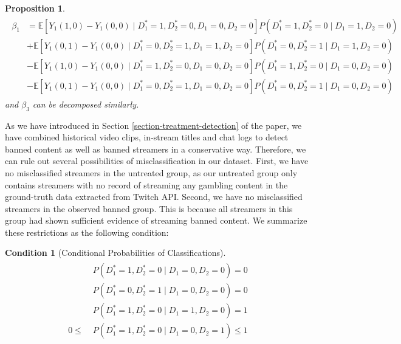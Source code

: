 \documentclass[a4paper,12pt]{article}
\newtheorem{condition}{Condition}
\newtheorem{proposition}{Proposition}
\begin{document}
\begin{proposition}\label{prop-1}
    \begin{align*}
        \begin{split}
            \beta_{1} &= \mathbb{E}[Y_1(1,0)-Y_1(0,0) \mid D_1^\ast=1, D_2^\ast=0,D_1=0,D_2=0]P(D_1^\ast=1,D_2^\ast=0 \mid D_1=1, D_2=0)\\
            &+ \mathbb{E}[Y_1(0,1)-Y_1(0,0) \mid D_1^\ast=0, D_2^\ast=1,D_1=1,D_2=0]P(D_1^\ast=0,D_2^\ast=1 \mid D_1=1, D_2=0)\\
            &-\mathbb{E}[Y_1(1,0)-Y_1(0,0) \mid D_1^\ast=1, D_2^\ast=0,D_1=0,D_2=0]P(D_1^\ast=1,D_2^\ast=0 \mid D_1=0, D_2=0)\\
            &-\mathbb{E}[Y_1(0,1)-Y_1(0,0) \mid D_1^\ast=0, D_2^\ast=1,D_1=0,D_2=0]P(D_1^\ast=0,D_2^\ast=1 \mid D_1=0, D_2=0)
        \end{split}
    \end{align*}
    and $\beta_{3}$ can be decomposed similarly.
\end{proposition}

As we have introduced in Section \ref{section-treatment-detection} of the paper, we have combined historical video clips, in-stream titles and chat logs to detect banned content as well as banned streamers in a conservative way. Therefore, we can rule out several possibilities of misclassification in our dataset. First, we have no misclassified streamers in the untreated group, as our untreated group only contains streamers with no record of streaming any gambling content in the ground-truth data extracted from Twitch API. Second, we have no misclassified streamers in the observed banned group. This is because all streamers in this group had shown sufficient evidence of streaming banned content. We summarize these restrictions as the following condition:

\begin{condition}[Conditional Probabilities of Classifications]\label{condition-1}
    \begin{align*}
    \begin{split}
        &P(D_1^\ast = 1, D_2^\ast = 0 \mid D_1 = 0, D_2 = 0) = 0\\
        &P(D_1^\ast = 0, D_2^\ast = 1 \mid D_1 = 0, D_2 = 0) = 0\\
        &P(D_1^\ast = 1, D_2^\ast = 0 \mid D_1 = 1, D_2 = 0) = 1\\
        0 \leq \;&P(D_1^\ast = 1, D_2^\ast = 0 \mid D_1 = 0, D_2 = 1) \leq 1
    \end{split}
    \end{align*}
\end{condition}
\end{document}
